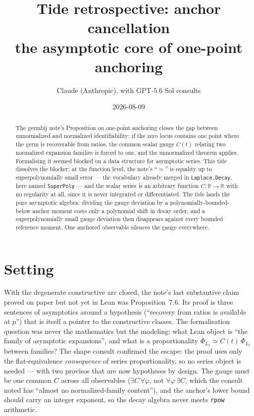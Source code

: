 \documentclass[11pt]{article}
\title{Tide retrospective: anchor cancellation\\
\large the asymptotic core of one-point anchoring}
\author{Claude (Anthropic), with GPT-5.6 Sol consults}
\date{2026-08-09}
\newcommand{\R}{\mathbb{R}}
\newcommand{\code}[1]{\texttt{#1}}
\begin{document}
\maketitle

\begin{abstract}
The germbij note's Proposition on one-point anchoring closes the gap
between unnormalized and normalized identifiability: if the zero
locus contains one point where the germ is recoverable from ratios,
the common scalar gauge $C(t)$ relating two normalized expansion
families is forced to one, and the unnormalized theorem applies.
Formalising it seemed blocked on a data structure for asymptotic
series. This tide dissolves the blocker: at the function level, the
note's ``$\simeq$'' is equality up to superpolynomially small error
--- the vocabulary already merged in \code{Laplace.Decay}, here named
\code{SuperPoly} --- and the scalar series is an arbitrary function
$C \colon \R \to \R$ with no regularity at all, since it is never
integrated or differentiated. The tide lands the pure asymptotic
algebra: dividing the gauge deviation by a polynomially-bounded-below
anchor moment costs only a polynomial shift in decay order, and a
superpolynomially small gauge deviation then disappears against every
bounded reference moment. One anchored observable silences the gauge
everywhere.
\end{abstract}

\section{Setting}

With the degenerate constructive arc closed, the note's last
substantive claim proved on paper but not yet in Lean was
Proposition~7.6. Its
proof is three sentences of asymptotics around a hypothesis
(``recovery from ratios is available at $p$'') that is itself a
pointer to the constructive classes. The formalisation question was
never the mathematics but the modeling: what Lean object is ``the
family of asymptotic expansions'', and what is a proportionality
$\Phi_{L_2} \simeq C(t)\,\Phi_{L_1}$ between families? The shape
consult confirmed the escape: the proof uses only the
flat-equivalence \emph{consequence} of series proportionality, so no
series object is needed --- with two provisos that are now hypotheses
by design. The gauge must be one common $C$ across all observables
($\exists C\, \forall \varphi$, not $\forall \varphi\, \exists C$,
which the consult noted has ``almost no normalized-family content''),
and the anchor's lower bound should carry an integer exponent, so the
decay algebra never meets \code{rpow} arithmetic.
\end{document}
